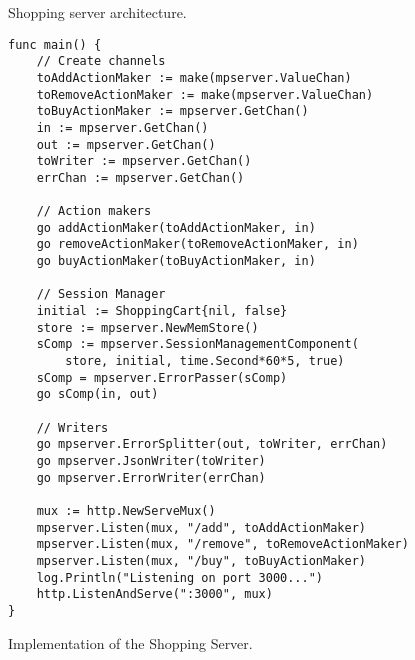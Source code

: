\begin{figure}[h]
\centering
{}
\caption[scale=1.0]{Shopping server architecture.}
\label{fig:shoppingDesign}
\end{figure}

\newpage
\begin{figure}[h]
\begin{lstlisting}
func main() {
    // Create channels
    toAddActionMaker := make(mpserver.ValueChan)
    toRemoveActionMaker := make(mpserver.ValueChan)
    toBuyActionMaker := mpserver.GetChan()
    in := mpserver.GetChan()
    out := mpserver.GetChan()
    toWriter := mpserver.GetChan()
    errChan := mpserver.GetChan()

    // Action makers
    go addActionMaker(toAddActionMaker, in)
    go removeActionMaker(toRemoveActionMaker, in)
    go buyActionMaker(toBuyActionMaker, in)

    // Session Manager
    initial := ShoppingCart{nil, false}
    store := mpserver.NewMemStore()
    sComp := mpserver.SessionManagementComponent(
        store, initial, time.Second*60*5, true)
    sComp = mpserver.ErrorPasser(sComp)
    go sComp(in, out)

    // Writers
    go mpserver.ErrorSplitter(out, toWriter, errChan)
    go mpserver.JsonWriter(toWriter)
    go mpserver.ErrorWriter(errChan)

    mux := http.NewServeMux()
    mpserver.Listen(mux, "/add", toAddActionMaker)
    mpserver.Listen(mux, "/remove", toRemoveActionMaker)
    mpserver.Listen(mux, "/buy", toBuyActionMaker)
    log.Println("Listening on port 3000...")
    http.ListenAndServe(":3000", mux)
}
\end{lstlisting}
\caption[scale=1.0]{Implementation of the Shopping Server.}
\label{fig:shoppingCode}
\end{figure}
